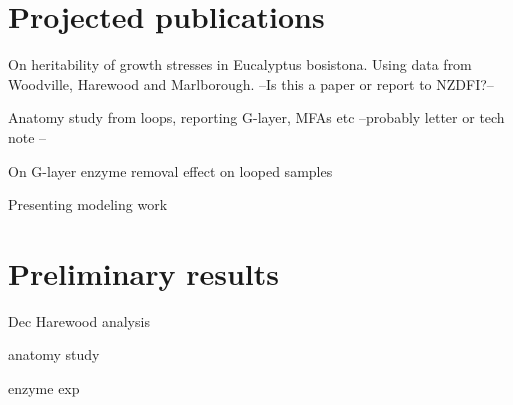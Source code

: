 \documentclass{article}
\begin{document}
\section{Projected publications}
On heritability of growth stresses in Eucalyptus bosistona. Using data from
Woodville, Harewood and Marlborough. --Is this a paper or report to NZDFI?--

Anatomy study from loops, reporting G-layer, MFAs etc --probably letter or tech
note --

On G-layer enzyme removal effect on looped samples

Presenting modeling work

\section{Preliminary results}
Dec Harewood analysis

anatomy study

enzyme exp
\end{document}
